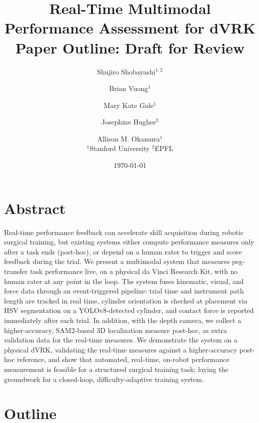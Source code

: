 \documentclass[11pt]{article}
\title{Real-Time Multimodal Performance Assessment for dVRK \\
\large Paper Outline: Draft for Review}
\author{
  Shujiro Shobayashi$^{1,2}$ \and
  Brian Vuong$^{1}$ \and %
  Mary Kate Gale$^{1}$ \and %
  Josephine Hughes$^2$ \and
  Allison M. Okamura$^{1}$ \\[2mm]
  \normalsize $^1$Stanford University \quad $^2$EPFL
}
\date{\today}
\begin{document}
\maketitle

\section*{Abstract}
Real-time performance feedback can accelerate skill acquisition during
robotic surgical training, but existing systems either compute
performance measures only after a task ends (post-hoc), or depend on a human
rater to trigger and score feedback during the trial. We present a
multimodal system that measures peg-transfer task performance live, on
a physical da Vinci Research Kit, with no human rater at any
point in the loop. The system fuses kinematic, visual, and force data
through an event-triggered pipeline: trial time and instrument path
length are tracked in real time, cylinder orientation is checked at
placement via HSV segmentation on a YOLOv8-detected
cylinder, and contact force is reported immediately after each trial.
In addition, with the depth camera, we collect a higher-accuracy,
SAM2-based 3D localization measure post-hoc, as extra
validation data for the
real-time measures. We demonstrate the system on a physical dVRK, validating the real-time measures against a higher-accuracy post-hoc reference, and show that automated, real-time, on-robot performance measurement is feasible for a structured surgical training task; laying the groundwork for a closed-loop, difficulty-adaptive training system.

\section*{Outline}
\end{document}

